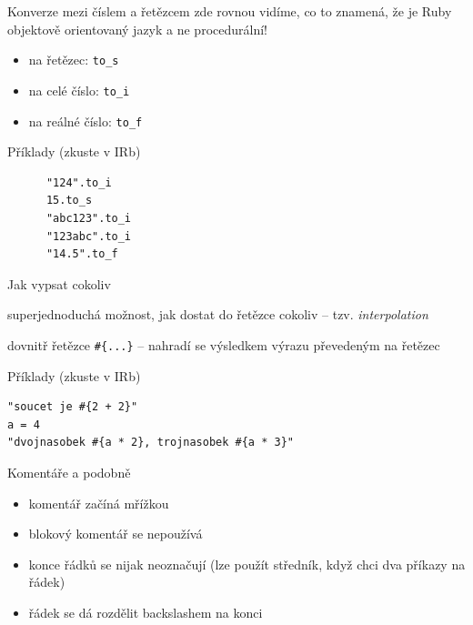 \documentclass{beamer}
\begin{document}
\begin{frame}[fragile]{Konverze mezi číslem a řetězcem}
  zde rovnou vidíme, co to znamená, že je Ruby objektově orientovaný jazyk a ne procedurální!
  \begin{itemize}
    \item na řetězec: \texttt{to\_s}
    \item na celé číslo: \texttt{to\_i}
    \item na reálné číslo: \texttt{to\_f}
  \end{itemize}
  \begin{block}{Příklady (zkuste v IRb)}
    \begin{verbatim}
      "124".to_i
      15.to_s
      "abc123".to_i
      "123abc".to_i
      "14.5".to_f
    \end{verbatim}
  \end{block}
\end{frame}

\begin{frame}[fragile]{Jak vypsat cokoliv}

  superjednoduchá možnost, jak dostat do řetězce cokoliv -- tzv. \emph{interpolation}

  dovnitř řetězce \texttt{\#\{...\}} -- nahradí se výsledkem výrazu převedeným na řetězec

  \begin{block}{Příklady (zkuste v IRb)}
    \begin{verbatim}
"soucet je #{2 + 2}"
a = 4
"dvojnasobek #{a * 2}, trojnasobek #{a * 3}"
    \end{verbatim}
  \end{block}
\end{frame}

\begin{frame}[fragile]{Komentáře a podobně}
  \begin{itemize}
    \item komentář začíná mřížkou
    \item blokový komentář se nepoužívá
  \end{itemize}
  \begin{itemize}
    \item konce řádků se nijak neoznačují (lze použít středník, když chci dva příkazy na řádek)
    \item řádek se dá rozdělit backslashem na konci
  \end{itemize}
\end{frame}
\end{document}
